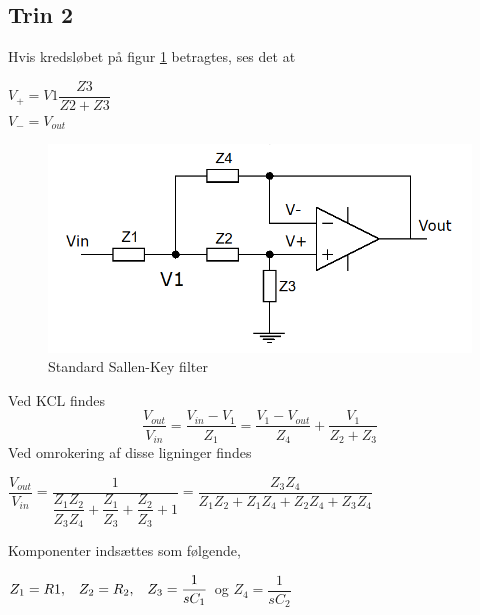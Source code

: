 \subsection{Trin 2}\label{sec::stage2}
Hvis kredsløbet på figur \ref{fig::anfilter_gensallen} betragtes, ses det at\\
\begin{center}
	$V_+ = V1\dfrac{Z3}{Z2+Z3}$\\
	\vspace*{5mm}
	$V_- = V_{out}$
\end{center}
\begin{figure}[h!]
	\centering
	\includegraphics[scale = 0.4]{./billeder/komp_udregn}
	\caption{Standard Sallen-Key filter}
	\label{fig::anfilter_gensallen}
\end{figure}
\FloatBlock

Ved KCL findes\\
\begin{equation}
	\dfrac{V_{out}}{V_{in}} = \dfrac{V_{in}-V_1}{Z_1} = \dfrac{V_1 - V_{out}}{Z_4}+\dfrac{V_1}{Z_2+Z_3}
\end{equation}
Ved omrokering af disse ligninger findes

\begin{center}
	$\dfrac{V_{out}}{V_{in}} = \dfrac{1}{\dfrac{Z_1Z_2}{Z_3Z_4}+\dfrac{Z_1}{Z_3}+\dfrac{Z_2}{Z_3}+1} = \dfrac{Z_3Z_4}{Z_1Z_2+Z_1Z_4+Z_2Z_4+Z_3Z_4}$
\end{center}

Komponenter indsættes som følgende,
\begin{center}
	$Z_1 = R1, \hspace{3mm} Z_2 = R_2, \hspace{3mm} Z_3 = \dfrac{1}{sC_1}$ \hspace{0.5mm} og \hspace{0.5mm} $Z_4 = \dfrac{1}{sC_2}$
\end{center}

